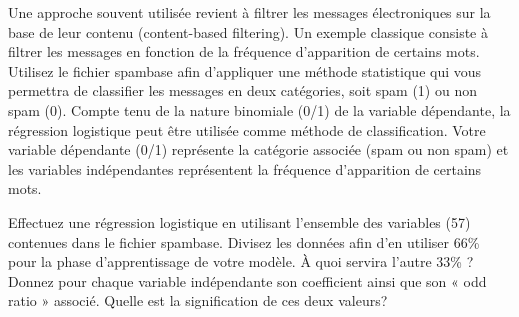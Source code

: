 	\begin{homeworkProblem}[Méthode statistique]
	
			Une approche souvent utilisée revient à filtrer les messages électroniques sur la base de
			leur contenu (content-based filtering). Un exemple classique consiste à filtrer les
			messages en fonction de la fréquence d’apparition de certains mots. Utilisez le fichier
			spambase afin d’appliquer une méthode statistique qui vous permettra de classifier les
			messages en deux catégories, soit spam (1) ou non spam (0).
			Compte tenu de la nature binomiale (0/1) de la variable dépendante, la régression
			logistique  peut être utilisée comme méthode de classification. Votre variable
			dépendante (0/1) représente la catégorie associée (spam ou non spam) et les variables
			indépendantes représentent la fréquence d’apparition de certains mots.	
	
		\begin{homeworkSection}{2.1}

			Effectuez une régression logistique en utilisant l’ensemble des variables (57)
			contenues dans le fichier spambase. Divisez les données afin d’en utiliser 66\% pour la
			phase d’apprentissage de votre modèle. À quoi servira l’autre 33\% ?
			Donnez pour chaque variable indépendante son coefficient ainsi que son « odd ratio »
			associé. Quelle est la signification de ces deux valeurs?\\

\end{homeworkSection}
\end{homeworkProblem}
